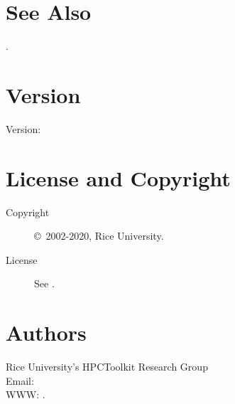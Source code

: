 \documentclass[english]{article}
\begin{document}


\section{See Also}

.

\section{Version}

Version: \Version

\section{License and Copyright}

\begin{description}
\item[Copyright] \copyright\ 2002-2020, Rice University.
\item[License] See .
\end{description}

\section{Authors}

\noindent
Rice University's HPCToolkit Research Group \\
Email:  \\
WWW: .

\LatexManEnd
\end{document}
